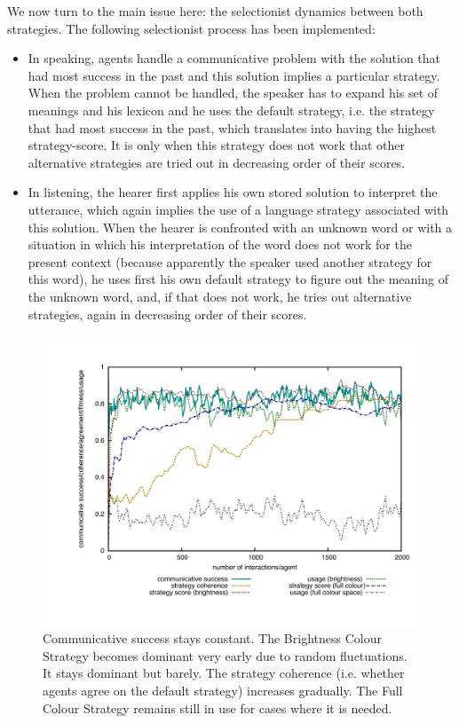 We now turn to the main issue here: the
selectionist dynamics between both strategies. The following selectionist process has been implemented: 
\begin{itemize}
\item In speaking, agents handle a communicative problem with the solution 
that had most success in the past and this solution implies a particular strategy. 
When the problem cannot be handled, the speaker 
has to expand his set of meanings and his lexicon and he uses the default strategy, 
i.e. the strategy that had most success in the past, which translates into having the highest
strategy-score. It is only when this strategy does not work that 
other alternative strategies are tried out in decreasing order of their scores. 
\item In listening, the hearer first applies his own 
stored solution to interpret the utterance, which again implies the use of a language strategy associated
with this solution. When the hearer is confronted with an unknown word or with a situation in which 
his interpretation of the word does not work for the present context (because apparently the speaker 
used another strategy for this word), he uses first his own default 
strategy to figure out the meaning of the unknown word, and, if that does not work, he tries out alternative
strategies, again in decreasing order of their scores. 
\end{itemize}


\begin{figure}[thb!]
\centerline{\includegraphics[width=\textwidth]{chap12/figs/strategies-one-winner.pdf}}
\caption{{Communicative success stays constant. The Brightness Colour Strategy becomes 
dominant very early due to random fluctuations. It stays dominant but barely. 
The strategy coherence (i.e. whether agents agree on the 
default strategy) increases gradually. The Full Colour Strategy remains still in use for cases where
it is needed. \label{fig:strategies-one}}}
\end{figure}

